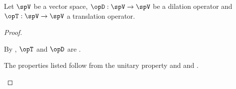 \begin{corollary}
\label{cor:wav_TD_prop}
Let $\spV$ be a vector space,
$\opD:\spV\to\spV$ be a dilation operator and $\opT:\spV\to\spV$ a translation operator.
\end{corollary}
\begin{proof}
\begin{liste}
  \item By , $\opT$ and $\opD$ are .
  \item The properties listed follow from the unitary property and 
        and .
\end{liste}
\end{proof}


